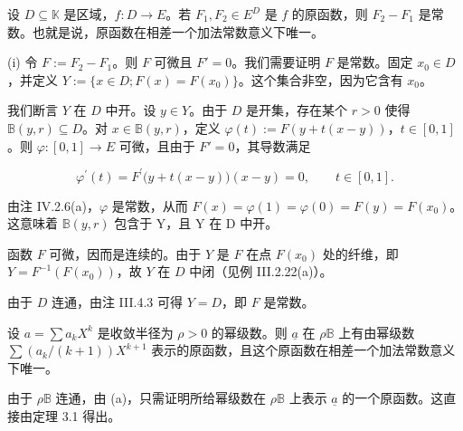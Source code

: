 \begin{remark}

\begin{items}
\item

设 $ D \subseteq \mathbb{K} $ 是区域，$ f: D \to E $。若 $ F_1, F_2 \in E^D $ 是 $ f $ 的原函数，则 $ F_2 - F_1 $ 是常数。也就是说，原函数在相差一个加法常数意义下唯一。

\begin{subitems}
\item

\proofhead
(i) 令 $F := F_2 - F_1$。则 $F$ 可微且 $F' = 0$。我们需要证明 $F$ 是常数。固定 $x_0 \in D$，并定义 $Y := \{ x \in D ; F(x) = F(x_0) \}$。这个集合非空，因为它含有 $x_0$。
\item

我们断言 $Y$ 在 $D$ 中开。设 $y \in Y$。由于 $D$ 是开集，存在某个 $r > 0$ 使得 $\mathbb{B}(y, r) \subseteq D$。对 $x \in \mathbb{B}(y, r)$，定义 $\varphi(t) := F(y + t(x - y))$，$t \in [0,1]$。则 $\varphi: [0,1] \to E$ 可微，且由于 $F' = 0$，其导数满足

\[
\varphi^{\prime}(t)=F^{\prime}\big(y+t(x-y)\big)(x-y)=0,\qquad t\in[0,1].
\]

由注 IV.2.6(a)，$ \varphi $ 是常数，从而 $ F(x) = \varphi(1) = \varphi(0) = F(y) = F(x_0) $。这意味着 $ \mathbb{B}(y, r) $ 包含于 Y，且 Y 在 D 中开。

\item

函数 $F$ 可微，因而是连续的。由于 $Y$ 是 $F$ 在点 $F(x_0)$ 处的纤维，即 $Y = F^{-1}(F(x_0))$，故 $Y$ 在 $D$ 中闭（见例 III.2.22(a)）。

\item

由于 $D$ 连通，由注 III.4.3 可得 $Y = D$，即 $F$ 是常数。

\end{subitems}

\item

设 $ a = \sum a_k X^k $ 是收敛半径为 $ \rho > 0 $ 的幂级数。则 $ \underline{a} $ 在 $ \rho\mathbb{B} $ 上有由幂级数 $ \sum(a_k/(k+1))X^{k+1} $ 表示的原函数，且这个原函数在相差一个加法常数意义下唯一。

\proofhead
由于 $\rho\mathbb{B}$ 连通，由 (a)，只需证明所给幂级数在 $\rho\mathbb{B}$ 上表示 $\underline{a}$ 的一个原函数。这直接由定理 3.1 得出。
\end{items}

\end{remark}

